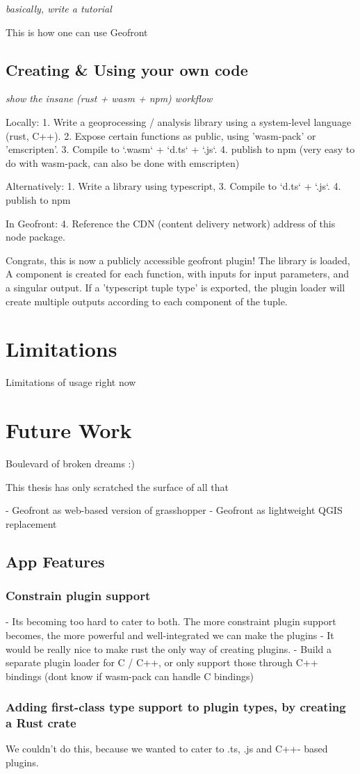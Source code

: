\emph{basically, write a tutorial}

This is how one can use Geofront

\subsection{Creating \& Using your own code}
\emph{show the insane (rust + wasm + npm) workflow}

Locally: 
1. Write a geoprocessing / analysis library using a system-level language (rust, C++).
2. Expose certain functions as public, using 'wasm-pack' or 'emscripten'.
3. Compile to `.wasm` + `d.ts` + `.js`.
4. publish to npm (very easy to do with wasm-pack, can also be done with emscripten)

Alternatively: 
1. Write a library using typescript, 
3. Compile to `d.ts` + `.js`.
4. publish to npm 

In Geofront: 
4. Reference the CDN (content delivery network) address of this node package. 

Congrats, this is now a publicly accessible geofront plugin!
The library is loaded, A component is created for each function, with inputs for input parameters, and a singular output. If a 'typescript tuple type' is exported, the plugin loader will create multiple outputs according to each component of the tuple.

\section{Limitations}%

Limitations of usage right now



\section{Future Work}
Boulevard of broken dreams :) 

This thesis has only scratched the surface of all that

- Geofront as web-based version of grasshopper
- Geofront as lightweight QGIS replacement 





\subsection{App Features}

\subsubsection{ Constrain plugin support}
- Its becoming too hard to cater to both. The more constraint plugin support becomes, the more powerful and well-integrated we can make the plugins
- It would be really nice to make rust the only way of creating plugins. 
- Build a separate plugin loader for C / C++, or only support those through C++ bindings (dont know if wasm-pack can handle C bindings)


\subsubsection{Adding first-class type support to plugin types, by creating a Rust crate }
We couldn't do this, because we wanted to cater to .ts, .js and C++- based plugins.